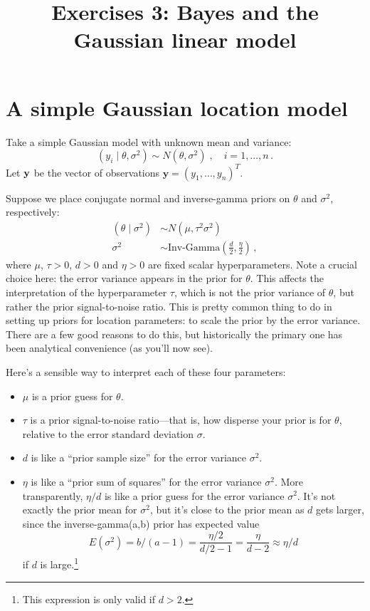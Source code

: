 \documentclass{mynotes}
\title[Exercises 3 $\cdot$ SDS 383D]{Exercises 3: Bayes and the Gaussian linear model}
\date{}  %
\begin{document}
\maketitle%


\section{A simple Gaussian location model}

Take a simple Gaussian model with unknown mean and variance:
\begin{equation}
\label{eqn:normal_model}
(y_i \mid \theta, \sigma^2) \sim N(\theta, \sigma^2) \; , \quad i = 1, \ldots, n \, .
\end{equation}
Let $\bf{y}$ be the vector of observations $\textbf{y} = (y_1, \ldots, y_n)^T$.

Suppose we place conjugate normal and inverse-gamma priors on $\theta$ and $\sigma^2$, respectively:
\begin{align*}
(\theta \mid \sigma^2) &\sim N(\mu, \tau^2 \sigma^2) \\
\sigma^2 &\sim \mbox{Inv-Gamma}\left( \frac{d}{2}, \frac{ \eta}{2} \right) \, ,
\end{align*}
where $\mu$, $\tau > 0$, $d>0$ and $\eta > 0$ are fixed scalar hyperparameters.  Note a crucial choice here: the error variance appears in the prior for $\theta$.  This affects the interpretation of the hyperparameter $\tau$, which is not the prior variance of $\theta$, but rather the prior signal-to-noise ratio.  This is pretty common thing to do in setting up priors for location parameters: to scale the prior by the error variance.  There are a few good reasons to do this, but historically the primary one has been analytical convenience (as you'll now see).

Here's a sensible way to interpret each of these four parameters:
\begin{itemize}
\item $\mu$ is a prior guess for $\theta$.
\item $\tau$ is a prior signal-to-noise ratio---that is, how disperse your prior is for $\theta$, relative to the error standard deviation $\sigma$.
\item $d$ is like a ``prior sample size'' for the error variance $\sigma^2$.
\item $\eta$ is like a ``prior sum of squares'' for the error variance $\sigma^2$.  More transparently, $\eta/d$ is like a prior guess for the error variance $\sigma^2$.  It's not exactly the prior mean for $\sigma^2$, but it's close to the prior mean as $d$ gets larger, since the inverse-gamma(a,b) prior has expected value
$$
E(\sigma^2) = b/(a-1) =  \frac{\eta / 2}{d/2 - 1} = \frac{\eta}{d - 2} \approx \eta/d
$$
if $d$ is large.\footnote{This expression is only valid if $d > 2$.}
\end{itemize}
\end{document}
